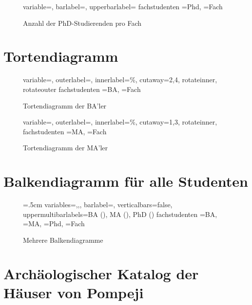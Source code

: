 \begin{figure}[h]
	\DTLbarchart%
	{variable=\phd,%
		barlabel=\fach,%
		upperbarlabel=\phd%
	}
	{fachstudenten}%
	{\phd=Phd,%
		\fach=Fach}
	\caption{Anzahl der PhD-Studierenden pro Fach}
	
\end{figure}

\section{Tortendiagramm}

\begin{figure}[h]
\DTLpiechart%
{variable=\ba,%
outerlabel=\fach,%
innerlabel={\DTLpiepercent\%},%
cutaway={2,4},%
rotateinner,%
rotateouter%
}
{fachstudenten}
{\ba=BA,%
\fach=Fach}
\caption{Tortendiagramm der BA'ler}
\end{figure}

\begin{figure}[h]
	\DTLpiechart%
	{variable=\ma,%
		outerlabel=\fach,%
		innerlabel={\DTLpiepercent\%},%
		cutaway={1,3},%
		rotateinner,%
		}
	{fachstudenten}
	{\ma=MA,%
		\fach=Fach}
	\caption{Tortendiagramm der MA'ler}
\end{figure}


\section{Balkendiagramm für alle Studenten}

\begin{figure}[h]
\DTLbarwidth=.5cm
\DTLmultibarchart%
{variables={\ba,\ma,\phd},%
barlabel=\fach,%
verticalbars=false,%
uppermultibarlabels={BA (\ba), MA (\ma), PhD (\phd)}}
{fachstudenten}
{\ba=BA,%
\ma=MA,%
\phd=Phd,%
\fach=Fach}
\caption{Mehrere Balkendiagramme}
\end{figure}

\section{Archäologischer Katalog der Häuser von Pompeji}





